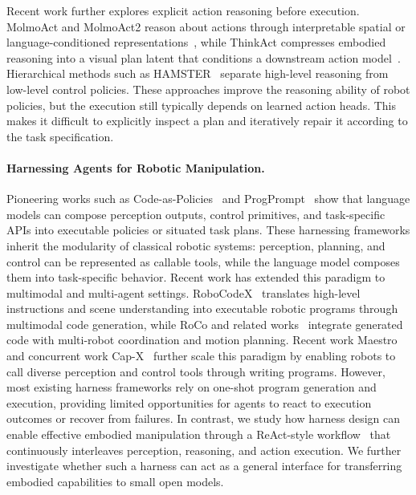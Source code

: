 \documentclass{llmxive}
\begin{document}
Recent work further explores explicit action reasoning before execution. MolmoAct and MolmoAct2 reason about actions through interpretable spatial or language-conditioned representations~\citep{lee2025molmoact,fang2026molmoact2actionreasoningmodels}, while ThinkAct compresses embodied reasoning into a visual plan latent that conditions a downstream action model~\citep{huang2026thinkact}. Hierarchical methods such as HAMSTER~\citep{li2025hamster} separate high-level reasoning from low-level control policies. 
These approaches improve the reasoning ability of robot policies, but the execution still typically depends on learned action heads. 
This makes it difficult to explicitly inspect a plan and iteratively repair it according to the task specification.

\vspace{-2mm}
\paragraph{Harnessing Agents for Robotic Manipulation.}
Pioneering works such as Code-as-Policies~\citep{liang2022codeap} and ProgPrompt~\citep{singh2023progprompt} show that language models can compose perception outputs, control primitives, and task-specific APIs into executable policies or situated task plans. 
These harnessing frameworks inherit the modularity of classical robotic systems: perception, planning, and control can be represented as callable tools, while the language model composes them into task-specific behavior. 
Recent work has extended this paradigm to multimodal and multi-agent settings. 
RoboCodeX~\citep{mu2024robocodex} translates high-level instructions and scene understanding into executable robotic programs through multimodal code generation, while RoCo and related works~\citep{mandi2024roco,chen2025emos} integrate generated code with multi-robot coordination and motion planning. 
Recent work Maestro~\citep{shi2025maestro} and concurrent work Cap-X~\citep{fu2026capxframeworkbenchmarkingimproving} further scale this paradigm by enabling robots to call diverse perception and control tools through writing programs.
However, most existing harness frameworks rely on one-shot program generation and execution, providing limited opportunities for agents to react to execution outcomes or recover from failures.
In contrast, we study how harness design can enable effective embodied manipulation through a ReAct-style workflow~\citep{yao2023reactsynergizingreasoningacting} that continuously interleaves perception, reasoning, and action execution. 
We further investigate whether such a harness can act as a general interface for transferring embodied capabilities to small open models.
\end{document}

